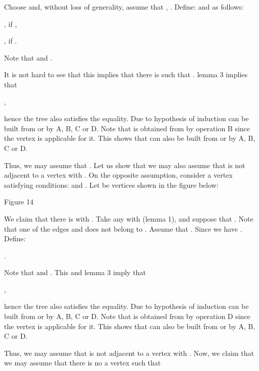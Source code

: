 \documentclass{article}
\begin{document}
Choose  and, without loss of
generality, assume that , .
Define:  and  as follows:

\begin{center}
,  if ,

,  if .
\end{center}

Note that  and .

It is not hard to see that this implies that there is  such that . lemma 3 implies that

\begin{center}
,
\end{center}

hence the tree  also satisfies the  equality. Due to hypothesis of induction  can be built from  or  by A, B, C or D. Note
that  is obtained from  by operation B since
the vertex  is applicable for it. This shows that  can also be built
from  or  by A, B, C or D.

Thus, we may assume that . Let us show that we may
also assume that  is not adjacent to a vertex  with . On the opposite assumption, consider a vertex  satisfying
conditions:  and . Let 
be vertices shown in the figure below:

\begin{center}

Figure 14\bigskip
\end{center}

We claim that there is  with . Take any  with  (lemma 1), and suppose that . Note that one of the edges  and  does not belong to . Assume that . Since  we have . Define:

\begin{center}
.
\end{center}

Note that  and . This and lemma 3 imply that

\begin{center}
,
\end{center}

hence the tree  also satisfies the  equality. Due to hypothesis of induction  can be built from  or  by A, B, C or D.
Note that  is obtained from  by
operation D since the vertex  is applicable for it. This shows that 
can also be built from  or  by A, B, C or D.

Thus, we may assume that  is not adjacent to a vertex  with . Now, we claim that we may assume that there is no a vertex  such that
\end{document}
